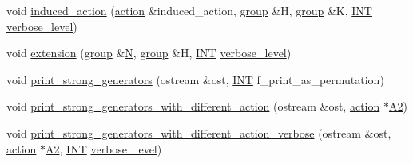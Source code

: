\begin{DoxyCompactItemize}
\item 
void \mbox{\hyperlink{classgroup_af6664c64704eb397874f42ed1ac7fed1}{induced\+\_\+action}} (\mbox{\hyperlink{classaction}{action}} \&induced\+\_\+action, \mbox{\hyperlink{classgroup}{group}} \&H, \mbox{\hyperlink{classgroup}{group}} \&K, \mbox{\hyperlink{galois_8h_a09fddde158a3a20bd2dcadb609de11dc}{I\+NT}} \mbox{\hyperlink{simeon_8_c_a818073fbcc2f439e7c56952f67386122}{verbose\+\_\+level}})
\item 
void \mbox{\hyperlink{classgroup_a798cd01cad4d5616b67fa456b8b04008}{extension}} (\mbox{\hyperlink{classgroup}{group}} \&\mbox{\hyperlink{_a_p_p_s_2_t_d_o_2packing_8_c_a0240ac851181b84ac374872dc5434ee4}{N}}, \mbox{\hyperlink{classgroup}{group}} \&H, \mbox{\hyperlink{galois_8h_a09fddde158a3a20bd2dcadb609de11dc}{I\+NT}} \mbox{\hyperlink{simeon_8_c_a818073fbcc2f439e7c56952f67386122}{verbose\+\_\+level}})
\item 
void \mbox{\hyperlink{classgroup_a28168557ca6d4330258f84127d2e5eca}{print\+\_\+strong\+\_\+generators}} (ostream \&ost, \mbox{\hyperlink{galois_8h_a09fddde158a3a20bd2dcadb609de11dc}{I\+NT}} f\+\_\+print\+\_\+as\+\_\+permutation)
\item 
void \mbox{\hyperlink{classgroup_af912cef2836d2571fd48f1c9ed4494e1}{print\+\_\+strong\+\_\+generators\+\_\+with\+\_\+different\+\_\+action}} (ostream \&ost, \mbox{\hyperlink{classaction}{action}} $\ast$\mbox{\hyperlink{simeon_8_c_a13fda35b8976a20080ec22b9d9e44e5b}{A2}})
\item 
void \mbox{\hyperlink{classgroup_ad958526581eabad1dc1b973d9e41de7c}{print\+\_\+strong\+\_\+generators\+\_\+with\+\_\+different\+\_\+action\+\_\+verbose}} (ostream \&ost, \mbox{\hyperlink{classaction}{action}} $\ast$\mbox{\hyperlink{simeon_8_c_a13fda35b8976a20080ec22b9d9e44e5b}{A2}}, \mbox{\hyperlink{galois_8h_a09fddde158a3a20bd2dcadb609de11dc}{I\+NT}} \mbox{\hyperlink{simeon_8_c_a818073fbcc2f439e7c56952f67386122}{verbose\+\_\+level}})
\end{DoxyCompactItemize}
